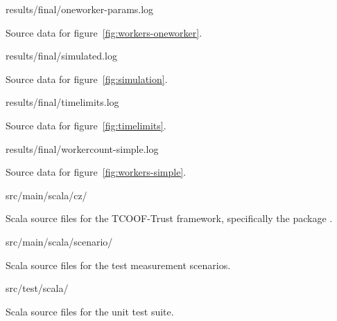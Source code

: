 \begin{filepath}
results/final/oneworker-params.log
\end{filepath}
\begin{dsldesc}
    Source data for figure~\ref{fig:workers-oneworker}.
\end{dsldesc}

\begin{filepath}
results/final/simulated.log
\end{filepath}
\begin{dsldesc}
    Source data for figure~\ref{fig:simulation}.
\end{dsldesc}

\begin{filepath}
results/final/timelimits.log
\end{filepath}
\begin{dsldesc}
    Source data for figure~\ref{fig:timelimits}.
\end{dsldesc}

\begin{filepath}
results/final/workercount-simple.log
\end{filepath}
\begin{dsldesc}
    Source data for figure~\ref{fig:workers-simple}.
\end{dsldesc}

\begin{filepath}
src/main/scala/cz/
\end{filepath}
\begin{dsldesc}
    Scala source files for the TCOOF-Trust framework, specifically the package
    .
\end{dsldesc}

\begin{filepath}
src/main/scala/scenario/
\end{filepath}
\begin{dsldesc}
    Scala source files for the test measurement scenarios.
\end{dsldesc}

\begin{filepath}
src/test/scala/
\end{filepath}
\begin{dsldesc}
    Scala source files for the unit test suite.
\end{dsldesc}

